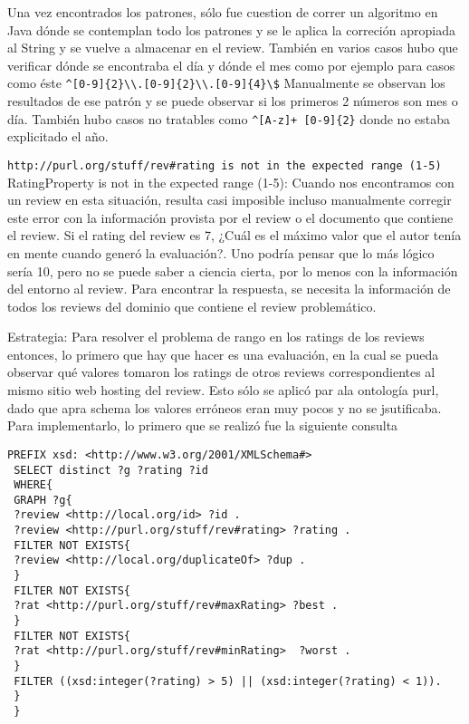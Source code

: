 Una vez encontrados los patrones, sólo fue cuestion de correr un algoritmo en Java dónde se contemplan todo los patrones y se 
le aplica la correción apropiada al String y se vuelve a almacenar en el review.
También en varios casos hubo que verificar dónde se encontraba el día y dónde el mes como por ejemplo para casos como éste 
\verb|^[0-9]{2}\\.[0-9]{2}\\.[0-9]{4}\$|
Manualmente se observan los resultados de ese patrón y se puede observar si los primeros 2 números son mes o día.
También hubo casos no tratables como \verb|^[A-z]+ [0-9]{2}| donde no estaba explicitado el año.

\verb|http://purl.org/stuff/rev#rating is not in the expected range (1-5)|\\


{RatingProperty} is not in the expected range (1-5):
Cuando nos encontramos con un review en esta situación, resulta casi imposible incluso manualmente corregir este error con la información 
provista por el review o el documento que contiene el review. Si el rating del review es 7, ¿Cuál es el máximo valor que el autor tenía en mente cuando  
generó la evaluación?. Uno podría pensar que lo más lógico sería 10, pero no se puede saber a ciencia cierta, por lo menos con la información del entorno al review.
Para encontrar la respuesta, se necesita la información de todos los reviews del dominio que contiene el review problemático. 

Estrategia:
Para resolver el problema de rango en los ratings de los reviews entonces, lo primero que hay que hacer es una evaluación, en la cual 
se pueda observar qué valores tomaron los ratings de otros reviews correspondientes al mismo sitio web hosting del review. 
Esto sólo se aplicó par ala ontología purl, dado que apra schema los valores erróneos eran muy pocos y no se jsutificaba.
Para implementarlo, lo primero que se realizó fue la siguiente consulta

\begin{lstlisting}[frame=single]
 PREFIX xsd: <http://www.w3.org/2001/XMLSchema#> 
 SELECT distinct ?g ?rating ?id 
 WHERE{
 GRAPH ?g{
 ?review <http://local.org/id> ?id .
 ?review <http://purl.org/stuff/rev#rating> ?rating .
 FILTER NOT EXISTS{
 ?review <http://local.org/duplicateOf> ?dup .
 }
 FILTER NOT EXISTS{
 ?rat <http://purl.org/stuff/rev#maxRating> ?best .
 }
 FILTER NOT EXISTS{
 ?rat <http://purl.org/stuff/rev#minRating>  ?worst .
 }
 FILTER ((xsd:integer(?rating) > 5) || (xsd:integer(?rating) < 1)).
 }
 }
\end{lstlisting}

